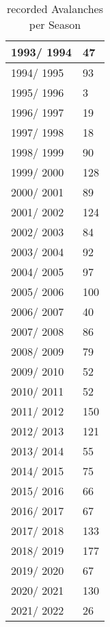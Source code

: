 \documentclass[../masterarbeit.tex]{subfiles}
\begin{document}
\begin{table}
\begin{tabular}{|l|l|}
        1993/ 1994 & 47 \\ \hline
        1994/ 1995 & 93 \\ \hline
        1995/ 1996 & 3 \\ \hline
        1996/ 1997 & 19 \\ \hline
        1997/ 1998 & 18 \\ \hline
        1998/ 1999 & 90 \\ \hline
        1999/ 2000 & 128 \\ \hline
        2000/ 2001 & 89 \\ \hline
        2001/ 2002 & 124 \\ \hline
        2002/ 2003 & 84 \\ \hline
        2003/ 2004 & 92 \\ \hline
        2004/ 2005 & 97 \\ \hline
        2005/ 2006 & 100 \\ \hline
        2006/ 2007 & 40 \\ \hline
        2007/ 2008 & 86 \\ \hline
        2008/ 2009 & 79 \\ \hline
        2009/ 2010 & 52 \\ \hline
        2010/ 2011 & 52 \\ \hline
        2011/ 2012 & 150 \\ \hline
        2012/ 2013 & 121 \\ \hline
        2013/ 2014 & 55 \\ \hline
        2014/ 2015 & 75 \\ \hline
        2015/ 2016 & 66 \\ \hline
        2016/ 2017 & 67 \\ \hline
        2017/ 2018 & 133 \\ \hline
        2018/ 2019 & 177 \\ \hline
        2019/ 2020 & 67 \\ \hline
        2020/ 2021 & 130 \\ \hline
        2021/ 2022 & 26 \\ \hline
    \end{tabular}
    \caption{recorded Avalanches per Season}
\end{table}
\end{document}
